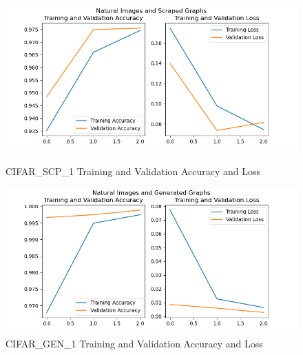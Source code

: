\documentclass[12pt]{article}
\begin{document}
            \begin{figure}
            
                \begin{center}

                    \includegraphics[scale=0.8]{CIFAR_SCP_1_HIST_RESULTS.png}
                    \caption{CIFAR\_SCP\_1 Training and Validation Accuracy and Loss}
                    \label{cifar-scp-acc-loss}
        
                \end{center}
                
        
            
                \begin{center}

                    \includegraphics[scale=0.8]{CIFAR_GEN_1_HIST_RESULTS.png}
                    \caption{CIFAR\_GEN\_1 Training and Validation Accuracy and Loss}
                    \label{cifar-gen-acc-loss}
        
                \end{center}

            \end{figure}
\end{document}
